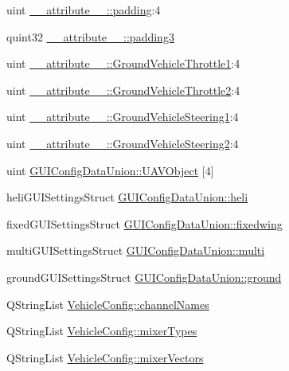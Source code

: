 \begin{DoxyCompactItemize}
\item 
uint \hyperlink{group___config_plugin_gae439ab85c005f3400498997049fd50e8}{\-\_\-\-\_\-attribute\-\_\-\-\_\-\-::padding}\-:4
\item 
quint32 \hyperlink{group___config_plugin_gae95d6e80e1c87598f33d4be1b0a8c410}{\-\_\-\-\_\-attribute\-\_\-\-\_\-\-::padding3}
\item 
uint \hyperlink{group___config_plugin_ga755435654b7373fe879e991ccdd40757}{\-\_\-\-\_\-attribute\-\_\-\-\_\-\-::\-Ground\-Vehicle\-Throttle1}\-:4
\item 
uint \hyperlink{group___config_plugin_ga6a8ae4214756c689b83b9f42a56c2505}{\-\_\-\-\_\-attribute\-\_\-\-\_\-\-::\-Ground\-Vehicle\-Throttle2}\-:4
\item 
uint \hyperlink{group___config_plugin_gad4fe3d4d30764b30210253be62bb0974}{\-\_\-\-\_\-attribute\-\_\-\-\_\-\-::\-Ground\-Vehicle\-Steering1}\-:4
\item 
uint \hyperlink{group___config_plugin_gab404016de72261d048356e628b9ef0b7}{\-\_\-\-\_\-attribute\-\_\-\-\_\-\-::\-Ground\-Vehicle\-Steering2}\-:4
\item 
uint \hyperlink{group___config_plugin_ga1a1fbf9187086cc92fac84f33f19402f}{G\-U\-I\-Config\-Data\-Union\-::\-U\-A\-V\-Object} \mbox{[}4\mbox{]}
\item 
heli\-G\-U\-I\-Settings\-Struct \hyperlink{group___config_plugin_gae9da8787d8f36ea6650045cf28c3b40d}{G\-U\-I\-Config\-Data\-Union\-::heli}
\item 
fixed\-G\-U\-I\-Settings\-Struct \hyperlink{group___config_plugin_ga10cc00a6af97a84e5f17358ed3c5eb34}{G\-U\-I\-Config\-Data\-Union\-::fixedwing}
\item 
multi\-G\-U\-I\-Settings\-Struct \hyperlink{group___config_plugin_ga2bab1814b15f618e30827215faea4f5e}{G\-U\-I\-Config\-Data\-Union\-::multi}
\item 
ground\-G\-U\-I\-Settings\-Struct \hyperlink{group___config_plugin_ga27dfb53cf12c8f8bb3a869bdfa8c11cf}{G\-U\-I\-Config\-Data\-Union\-::ground}
\item 
Q\-String\-List \hyperlink{group___config_plugin_gaca881ae0a25d7e063b68a36b2f5576bf}{Vehicle\-Config\-::channel\-Names}
\item 
Q\-String\-List \hyperlink{group___config_plugin_ga494123875db35fe04e5a0512850e8c02}{Vehicle\-Config\-::mixer\-Types}
\item 
Q\-String\-List \hyperlink{group___config_plugin_ga0f47a1cc91e5a63c70f0802f3533e193}{Vehicle\-Config\-::mixer\-Vectors}
\item 

\end{DoxyCompactItemize}
